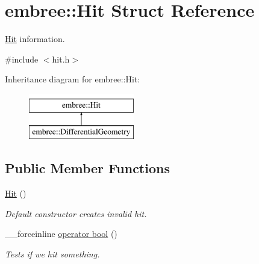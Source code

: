 \hypertarget{structembree_1_1_hit}{
\section{embree::Hit Struct Reference}
\label{structembree_1_1_hit}
}


\hyperlink{structembree_1_1_hit}{Hit} information.  




{\ttfamily \#include $<$hit.h$>$}

Inheritance diagram for embree::Hit:\begin{figure}[H]
\begin{center}
\leavevmode
\includegraphics[height=2.000000cm]{structembree_1_1_hit}
\end{center}
\end{figure}
\subsection*{Public Member Functions}
\begin{DoxyCompactItemize}
\item 
\hyperlink{structembree_1_1_hit_a138b63db64c6d252a98540d07b144920}{Hit} ()
\begin{DoxyCompactList}\small\item\em Default constructor creates invalid hit. \item\end{DoxyCompactList}\item 
\_\-\_\-forceinline \hyperlink{structembree_1_1_hit_a3747b6f0eb2df0e9e00259caae226c37}{operator bool} ()
\begin{DoxyCompactList}\small\item\em Tests if we hit something. \item\end{DoxyCompactList}\end{DoxyCompactItemize}
